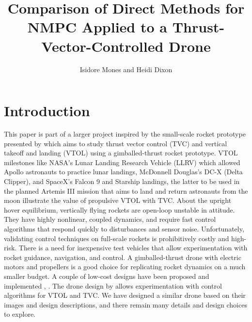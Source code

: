 \documentclass[]{article}
\title{Comparison of Direct Methods for NMPC Applied to a Thrust-Vector-Controlled Drone}
\author{Isidore Mones and Heidi Dixon}
\begin{document}
\maketitle
	
\section*{Introduction}	
	This paper is part of a larger project inspired by the small-scale rocket prototype presented by \cite{TVCDrone} which aims to study thrust vector control (TVC) and vertical takeoff and landing (VTOL) using a gimballed-thrust rocket prototype. 
	VTOL milestones like NASA's Lunar Landing Research Vehicle (LLRV) which allowed Apollo astronauts to practice lunar landings, McDonnell Douglas’s DC-X (Delta Clipper), and SpaceX's Falcon 9 and Starship landings, the latter to be used in the planned Artemis III mission that aims to land and return astronauts from the moon illustrate the value of propulsive VTOL with TVC. 	
	About the upright hover equilibrium, vertically flying rockets are open-loop unstable in attitude. They have highly nonlinear, coupled dynamics, and require fast control algorithms that respond quickly to disturbances and sensor noise. Unfortunately, validating control techniques on full-scale rockets is prohibitively costly and high-risk. There is a need for inexpensive test vehicles that allow experimentation with rocket guidance, navigation, and control. 
	A gimballed-thrust drone with electric motors and propellers is a good choice for replicating rocket dynamics on a much smaller budget. A couple of low-cost designs have been proposed and implemented  \citep{cheapTVC}, \citep{TVCDrone}. The drone design by \cite{TVCDrone} allows experimentation with control algorithms for VTOL and TVC. We have designed a similar drone based on their images and design descriptions, and there remain many details and design choices to explore.
\end{document}
